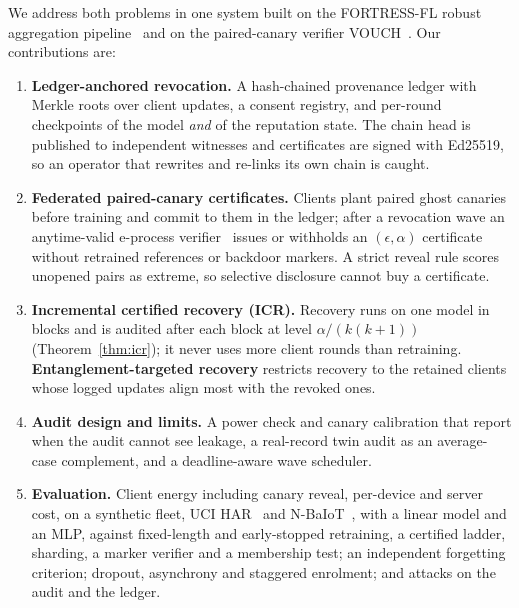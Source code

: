 \documentclass[journal]{IEEEtran}
\newcommand{\ours}{FORTRESS-FL}
\begin{document}
We address both problems in one system built on the \ours{} robust aggregation pipeline~\cite{dang2026fortress} and on the paired-canary verifier VOUCH~\cite{dang2026vouch}. Our contributions are:
\begin{enumerate}
\item \textbf{Ledger-anchored revocation.} A hash-chained provenance ledger with Merkle roots over client updates, a consent registry, and per-round checkpoints of the model \emph{and} of the reputation state. The chain head is published to independent witnesses and certificates are signed with Ed25519, so an operator that rewrites and re-links its own chain is caught.
\item \textbf{Federated paired-canary certificates.} Clients plant paired ghost canaries before training and commit to them in the ledger; after a revocation wave an anytime-valid e-process verifier~\cite{dang2026vouch} issues or withholds an $(\epsilon,\alpha)$ certificate without retrained references or backdoor markers. A strict reveal rule scores unopened pairs as extreme, so selective disclosure cannot buy a certificate.
\item \textbf{Incremental certified recovery (ICR).} Recovery runs on one model in blocks and is audited after each block at level $\alpha/(k(k{+}1))$ (Theorem~\ref{thm:icr}); it never uses more client rounds than retraining. \textbf{Entanglement-targeted recovery} restricts recovery to the retained clients whose logged updates align most with the revoked ones.
\item \textbf{Audit design and limits.} A power check and canary calibration that report when the audit cannot see leakage, a real-record twin audit as an average-case complement, and a deadline-aware wave scheduler.
\item \textbf{Evaluation.} Client energy including canary reveal, per-device and server cost, on a synthetic fleet, UCI HAR~\cite{anguita2013} and N-BaIoT~\cite{meidan2018}, with a linear model and an MLP, against fixed-length and early-stopped retraining, a certified ladder, sharding, a marker verifier and a membership test; an independent forgetting criterion; dropout, asynchrony and staggered enrolment; and attacks on the audit and the ledger.
\end{enumerate}
\end{document}
